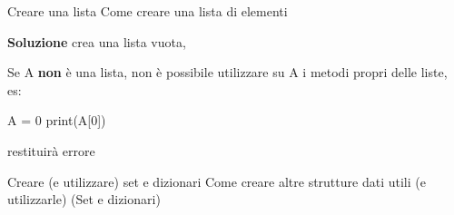 \documentclass[10pt]{extarticle}
\makeatletter
\newcommand{\<}{\langle}
\renewcommand{\>}{\rangle}
\renewenvironment{proof}[1][\proofname] {\par\pushQED{\qed}
\renewcommand*{\proofname}{Soluzione}
{\normalfont\sffamily\bfseries\topsep6\p@\@plus6\p@\relax #1\@addpunct{.} }}{\popQED\endtrivlist\@endpefalse}
\theoremstyle{mystyle}{\newtheorem*{remark}{Nota}}
\theoremstyle{mystyle}{\newtheorem*{remarks}{Note}}
\theoremstyle{mystyle}{\newtheorem*{example}{Esempio}}
\theoremstyle{mystyle}{\newtheorem*{examples}{Esempi}}
\theoremstyle{definition}{\newtheorem*{exercise}{Exercise}}
\theoremstyle{warn}
\makeatother
\begin{document}
\begin{definition}{Creare una lista}{}
Come creare una lista di elementi
\end{definition}
\begin{proof}
 crea una lista vuota, 
\end{proof}

\begin{remark}
Se A \textbf{non} è una lista, non è possibile utilizzare su A i metodi propri delle liste, es:
\begin{python}
A = 0
print(A[0])
\end{python}
restituirà errore
\end{remark}

\begin{definition}{Creare (e utilizzare) set e dizionari}{}
Come creare altre strutture dati utili (e utilizzarle) (Set e dizionari)
\end{definition}
\end{document}
